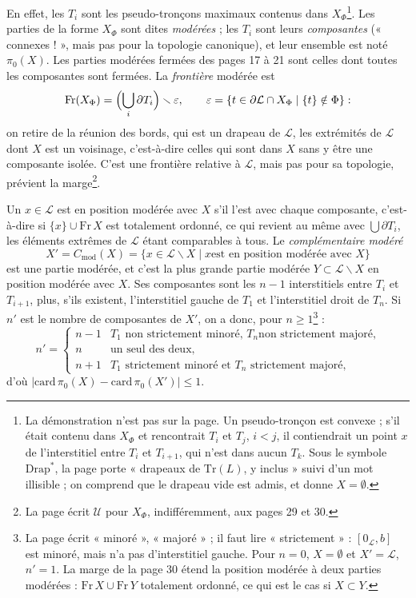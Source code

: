 \documentclass[11pt,a4paper]{article}
\begin{document}
En effet, les $T_{i}$ sont les pseudo-tronçons maximaux contenus dans
$X_{\Phi}$\footnote{La démonstration n'est pas sur la page. Un pseudo-tronçon est
convexe ; s'il était contenu dans $X_{\Phi}$ et rencontrait $T_{i}$ et $T_{j}$,
$i < j$, il contiendrait un point $x$ de l'interstitiel entre $T_{i}$ et
$T_{i+1}$, qui n'est dans aucun $T_{k}$. Sous le symbole $\mathrm{Drap}^{*}$, la
page porte « drapeaux de $\mathrm{Tr}(L)$, y inclus » suivi d'un mot
illisible ; on comprend que le drapeau vide est admis, et donne $X =
\emptyset$.}. Les parties de la forme $X_{\Phi}$ sont dites \emph{modérées} ; les
$T_{i}$ sont leurs \emph{composantes} (« connexes ! », mais pas pour la
topologie canonique), et leur ensemble est noté $\pi_{0}(X)$. Les parties
modérées fermées des pages 17 à 21 sont celles dont toutes les composantes
sont fermées. La \emph{frontière} modérée est
\[
\mathrm{Fr}(X_{\Phi}) = \Bigl(\bigcup_{i} \partial T_{i}\Bigr) \smallsetminus
\varepsilon, \qquad \varepsilon = \{t \in \partial \mathcal{L} \cap X_{\Phi}
\mid \{t\} \notin \Phi\} :
\]
on retire de la réunion des bords, qui est un drapeau de $\mathcal{L}$, les
extrémités de $\mathcal{L}$ dont $X$ est un voisinage, c'est-à-dire celles qui
sont dans $X$ sans y être une composante isolée. C'est une frontière relative à
$\mathcal{L}$, mais pas pour sa topologie, prévient la marge\footnote{La page
écrit $\mathcal{U}$ pour $X_{\Phi}$, indifféremment, aux pages 29 et 30.}.

Un $x \in \mathcal{L}$ est en position modérée avec $X$ s'il l'est avec chaque
composante, c'est-à-dire si $\{x\} \cup \mathrm{Fr}\, X$ est totalement ordonné,
ce qui revient au même avec $\bigcup \partial T_{i}$, les éléments extrêmes
de $\mathcal{L}$ étant comparables à tous. Le \emph{complémentaire modéré}
\[
X' = C_{\mathrm{mod}}(X) = \{x \in \mathcal{L} \smallsetminus X \mid x \text{
est en position modérée avec } X\}
\]
est une partie modérée, et c'est la plus grande partie modérée $Y \subset
\mathcal{L} \smallsetminus X$ en position modérée avec $X$. Ses composantes
sont les $n - 1$ interstitiels entre $T_{i}$ et $T_{i+1}$, plus, s'ils existent,
l'interstitiel gauche de $T_{1}$ et l'interstitiel droit de $T_{n}$. Si $n'$ est
le nombre de composantes de $X'$, on a donc, pour $n \geq 1$\footnote{La page
écrit « minoré », « majoré » ; il faut lire « strictement » : $[0_{\mathcal{L}},
b]$ est minoré, mais n'a pas d'interstitiel gauche. Pour $n = 0$, $X = \emptyset$
et $X' = \mathcal{L}$, $n' = 1$. La marge de la page 30 étend la position
modérée à deux parties modérées : $\mathrm{Fr}\, X \cup \mathrm{Fr}\, Y$
totalement ordonné, ce qui est le cas si $X \subset Y$.} :
\[
n' = \begin{cases} n - 1 & T_{1} \text{ non strictement minoré, } T_{n} \text{
non strictement majoré,} \\ n & \text{un seul des deux,} \\ n + 1 & T_{1}
\text{ strictement minoré et } T_{n} \text{ strictement majoré,} \end{cases}
\]
d'où $|\mathrm{card}\, \pi_{0}(X) - \mathrm{card}\, \pi_{0}(X')| \leq 1$.
\end{document}
